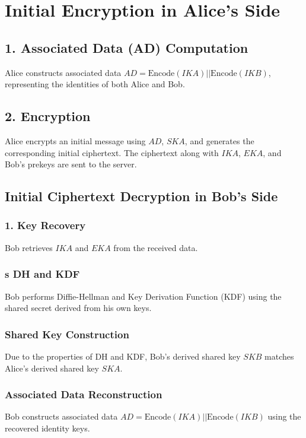\documentclass[11pt]{article}
\begin{document}
\section{Initial Encryption in Alice’s Side}
\subsection{1. Associated Data (AD) Computation}
Alice constructs associated data \( AD = \text{Encode}(IKA) || \text{Encode}(IKB) \), representing the identities of both Alice and Bob.

\subsection{2. Encryption}
Alice encrypts an initial message using \( AD \), \( SKA \), and generates the corresponding initial ciphertext. The ciphertext along with \( IKA \), \( EKA \), and Bob's prekeys are sent to the server.

\subsection{Initial Ciphertext Decryption in Bob’s Side}
\subsubsection{1. Key Recovery}
Bob retrieves \( IKA \) and \( EKA \) from the received data.

\subsubsection{s DH and KDF}
Bob performs Diffie-Hellman and Key Derivation Function (KDF) using the shared secret derived from his own keys.

\subsubsection{Shared Key Construction}
Due to the properties of DH and KDF, Bob's derived shared key \( SKB \) matches Alice's derived shared key \( SKA \).

\subsubsection{Associated Data Reconstruction}
Bob constructs associated data \( AD = \text{Encode}(IKA) || \text{Encode}(IKB) \) using the recovered identity keys.
\end{document}

